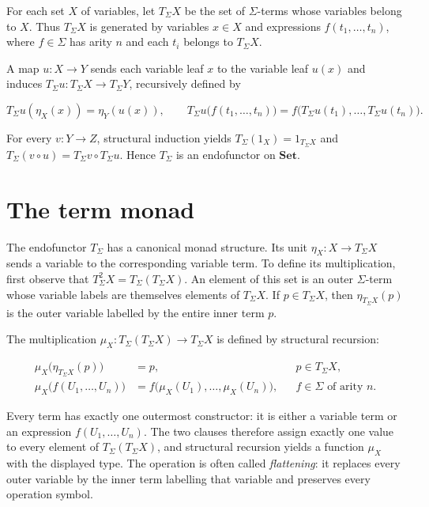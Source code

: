 \documentclass[11pt]{article}
\begin{document}
For each set \(X\) of variables, let \(T_\Sigma X\) be the set of
\(\Sigma\)-terms whose variables belong to \(X\). Thus \(T_\Sigma X\) is
generated by variables \(x\in X\) and expressions
\(f(t_1,\ldots,t_n)\), where \(f\in\Sigma\) has arity \(n\) and each
\(t_i\) belongs to \(T_\Sigma X\).

A map \(u:X\to Y\) sends each variable leaf \(x\) to the variable leaf
\(u(x)\) and induces \(T_\Sigma u:T_\Sigma X\to T_\Sigma Y\), recursively
defined by

\[
T_\Sigma u(\eta_X(x))=\eta_Y(u(x)),\qquad
T_\Sigma u\bigl(f(t_1,\ldots,t_n)\bigr)
=f\bigl(T_\Sigma u(t_1),\ldots,T_\Sigma u(t_n)\bigr).
\]

For every \(v:Y\to Z\), structural induction yields
\(T_\Sigma(1_X)=1_{T_\Sigma X}\) and
\(T_\Sigma(v\circ u)=T_\Sigma v\circ T_\Sigma u\). Hence \(T_\Sigma\) is an
endofunctor on \(\mathbf{Set}\).

\section{The term monad}\label{the-term-monad}

The endofunctor \(T_\Sigma\) has a canonical monad structure. Its unit
\(\eta_X:X\to T_\Sigma X\) sends a variable to the corresponding variable
term. To define its multiplication, first observe that
\(T_\Sigma^2X=T_\Sigma(T_\Sigma X)\). An element of this set is an outer
\(\Sigma\)-term whose variable labels are themselves elements of
\(T_\Sigma X\). If \(p\in T_\Sigma X\), then
\(\eta_{T_\Sigma X}(p)\) is the outer variable labelled by the entire inner
term \(p\).

The multiplication \(\mu_X:T_\Sigma(T_\Sigma X)\to T_\Sigma X\) is defined
by structural recursion:

\[
\begin{aligned}
\mu_X\bigl(\eta_{T_\Sigma X}(p)\bigr)&=p,
&&p\in T_\Sigma X,\\
\mu_X\bigl(f(U_1,\ldots,U_n)\bigr)
&=f\bigl(\mu_X(U_1),\ldots,\mu_X(U_n)\bigr),
&&f\in\Sigma\text{ of arity }n.
\end{aligned}
\]

Every term has exactly one outermost constructor: it is either a variable term
or an expression \(f(U_1,\ldots,U_n)\). The two clauses therefore assign
exactly one value to every element of \(T_\Sigma(T_\Sigma X)\), and structural
recursion yields a function \(\mu_X\) with the displayed type. The operation is
often called \emph{flattening}: it replaces every outer variable by the inner
term labelling that variable and preserves every operation symbol.
\end{document}
